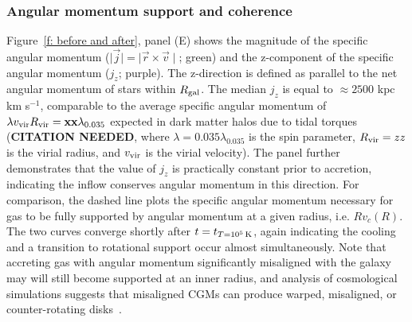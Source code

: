 \documentclass[fleqn,usenatbib]{mnras}
\newcommand{\tcon}{t_{T=10^5\,{\rm K}}}
\newcommand{\Rvir}{R_{\rm vir}}
\newcommand{\vvir}{v_{\rm vir}}
\begin{document}
\subsubsection{Angular momentum support and coherence}
\label{s: mechanics -- angular momentum}

Figure~\ref{f: before and after}, panel (E) shows the magnitude of the specific angular momentum ($\mid \vec j \mid = \mid \vec r \times \vec v \mid$; green) and the z-component of the specific angular momentum ($j_z$; purple).
The z-direction is defined as parallel to the net angular momentum of stars within $R_{\rm gal}$.
The median $j_z$ is equal to $\approx 2500$ kpc km s$^{-1}$, comparable to the average specific angular momentum of $\lambda \vvir \Rvir=\mathbf{xx}\lambda_{0.035}$ expected in dark matter halos due to tidal torques (\textbf{CITATION NEEDED}, where $\lambda = 0.035 \lambda_{0.035}$ is the spin parameter,  $\Rvir=zz$ is the virial radius, and $\vvir$ is the virial velocity).
The panel further demonstrates that the value of $j_z$ is practically constant prior to accretion, indicating the inflow conserves angular momentum in this direction.
For comparison, the dashed line plots the specific angular momentum necessary for gas to be fully supported by angular momentum at a given radius, i.e. $Rv_c(R)$.
The two curves converge shortly after $t=\tcon$, again indicating the cooling and a transition to rotational support occur almost simultaneously. 
Note that accreting gas with angular momentum significantly misaligned with the galaxy may will still become supported at an inner radius, and analysis of cosmological simulations suggests that misaligned CGMs can produce warped, misaligned, or counter-rotating disks~\citep[e.g.][]{Roskar2010, Starkenburg2019}.
\end{document}
